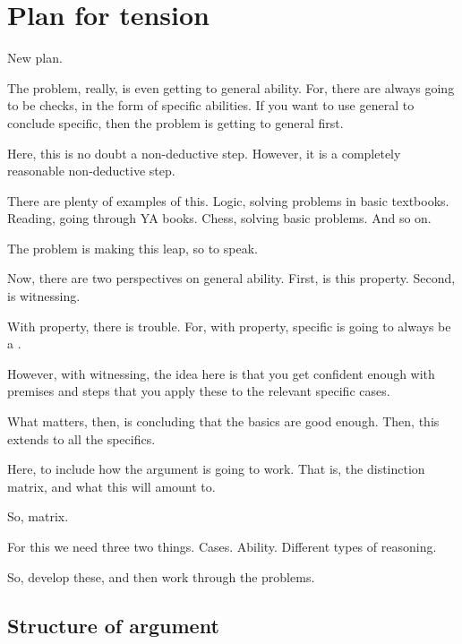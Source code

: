 \chapter{Plan for tension}

\begin{note}
  \color{red}
  New plan.

  The problem, really, is even getting to general ability.
  For, there are always going to be checks, in the form of specific abilities.
  If you want to use general to conclude specific, then the problem is getting to general first.

  Here, this is no doubt a non-deductive step.
  However, it is a completely reasonable non-deductive step.

  There are plenty of examples of this.
  Logic, solving problems in basic textbooks.
  Reading, going through YA books.
  Chess, solving basic problems.
  And so on.

  The problem is making this leap, so to speak.

  Now, there are two perspectives on general ability.
  First, is this property.
  Second, is witnessing.

  With property, there is trouble.
  For, with property, specific is going to always be a \requ{}.

  However, with witnessing, the idea here is that you get confident enough with premises and steps that you apply these to the relevant specific cases.

  What matters, then, is concluding that the basics are good enough.
  Then, this extends to all the specifics.
\end{note}

\begin{note}
  Here, to include how the argument is going to work.
  That is, the distinction matrix, and what this will amount to.

  So, matrix.

  For this we need three two things.
  Cases.
  Ability.
  Different types of reasoning.

  So, develop these, and then work through the problems.
\end{note}

\section{Structure of argument}
\label{sec:structure-argument}

